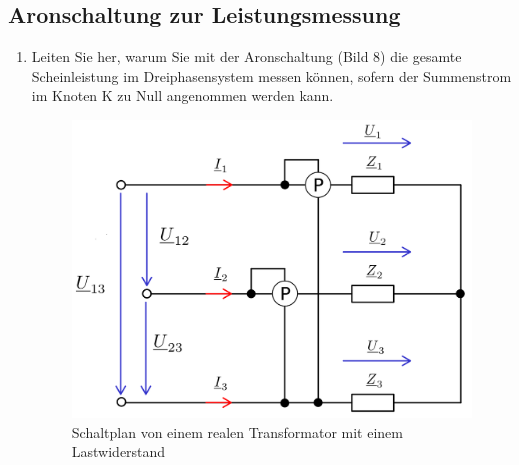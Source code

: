 \subsection{Aronschaltung zur Leistungsmessung }
\begin{enumerate}[label=\alph*)]
	\item Leiten Sie her, warum Sie mit der Aronschaltung (Bild 8) die gesamte
	      Scheinleistung im Dreiphasensystem messen können, sofern der Summenstrom im
	      Knoten K zu Null angenommen werden kann.

	      \begin{figure}[h!]
		      \begin{center}
			      \begin{minipage}[ct]{0.4\linewidth}
				      \begin{center}
					      \includegraphics[width=\linewidth]{img/2.2.1.1.png}
				      \end{center}
				      \caption{Schaltplan von einem realen Transformator mit einem Lastwiderstand}\label{img/2.2.1.1}
			      \end{minipage}
			      \hspace{.1\linewidth}
			      \begin{minipage}[ct]{0.4\linewidth}
				      \begin{center}

\end{center}
\end{minipage}
\end{center}
\end{figure}
\end{enumerate}
